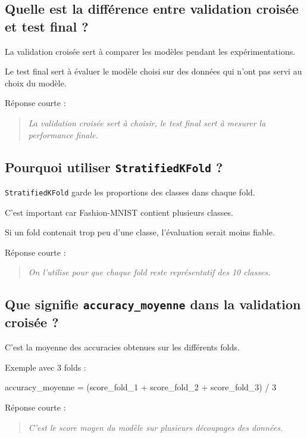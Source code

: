 \documentclass[11pt,a4paper]{article}
\begin{document}
\subsection{Quelle est la différence entre validation croisée et test final ?}

La validation croisée sert à comparer les modèles pendant les expérimentations.

Le test final sert à évaluer le modèle choisi sur des données qui n'ont pas servi au choix du modèle.

Réponse courte :

\begin{quote}
\itshape La validation croisée sert à choisir, le test final sert à mesurer la performance finale.
\end{quote}

\subsection{Pourquoi utiliser \texttt{StratifiedKFold} ?}

\texttt{StratifiedKFold} garde les proportions des classes dans chaque fold.

C'est important car Fashion-MNIST contient plusieurs classes.

Si un fold contenait trop peu d'une classe, l'évaluation serait moins fiable.

Réponse courte :

\begin{quote}
\itshape On l'utilise pour que chaque fold reste représentatif des 10 classes.
\end{quote}

\subsection{Que signifie \texttt{accuracy\_moyenne} dans la validation croisée ?}

C'est la moyenne des accuracies obtenues sur les différents folds.

Exemple avec 3 folds :

\begin{codeblock}
accuracy_moyenne = (score_fold_1 + score_fold_2 + score_fold_3) / 3
\end{codeblock}

Réponse courte :

\begin{quote}
\itshape C'est le score moyen du modèle sur plusieurs découpages des données.
\end{quote}
\end{document}

